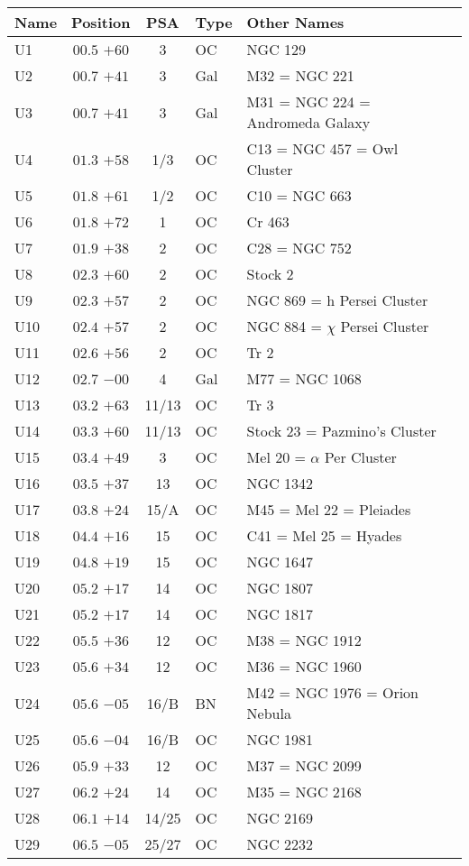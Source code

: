 \begin{table}[p]
\setlength{\tabcolsep}{3pt}
\small
\begin{tabular}{lcclll}
\hline
Name&Position&PSA&Type&Other Names\\
\hline
U1  &$00.5$ $+60$&3&OC &NGC 129\\
U2  &$00.7$ $+41$&3&Gal&M32 = NGC 221\\
U3  &$00.7$ $+41$&3&Gal&M31 = NGC 224 = Andromeda Galaxy\\
U4  &$01.3$ $+58$&1/3&OC &C13 = NGC 457 = Owl Cluster\\
U5  &$01.8$ $+61$&1/2&OC &C10 = NGC 663\\
U6  &$01.8$ $+72$&1&OC &Cr 463\\
U7  &$01.9$ $+38$&2&OC &C28 = NGC 752\\
U8  &$02.3$ $+60$&2&OC &Stock 2\\
U9  &$02.3$ $+57$&2&OC &NGC 869 = h Persei Cluster\\
U10 &$02.4$ $+57$&2&OC &NGC 884 = $\chi$ Persei Cluster\\
U11 &$02.6$ $+56$&2&OC &Tr 2\\
U12 &$02.7$ $-00$&4&Gal&M77 = NGC 1068\\
U13 &$03.2$ $+63$&11/13&OC &Tr 3\\
U14 &$03.3$ $+60$&11/13&OC &Stock 23 = Pazmino's Cluster\\
U15 &$03.4$ $+49$&3&OC &Mel 20 = $\alpha$ Per Cluster\\
U16 &$03.5$ $+37$&13&OC &NGC 1342\\
U17 &$03.8$ $+24$&15/A&OC &M45 = Mel 22 = Pleiades\\
U18 &$04.4$ $+16$&15&OC &C41 = Mel 25 = Hyades\\
U19 &$04.8$ $+19$&15&OC &NGC 1647\\
U20 &$05.2$ $+17$&14&OC &NGC 1807\\
U21 &$05.2$ $+17$&14&OC &NGC 1817\\
U22 &$05.5$ $+36$&12&OC &M38 = NGC 1912\\
U23 &$05.6$ $+34$&12&OC &M36 = NGC 1960\\
U24 &$05.6$ $-05$&16/B&BN &M42 = NGC 1976 = Orion Nebula\\
U25 &$05.6$ $-04$&16/B&OC &NGC 1981\\
U26 &$05.9$ $+33$&12&OC &M37 = NGC 2099\\
U27 &$06.2$ $+24$&14&OC &M35 = NGC 2168\\
U28 &$06.1$ $+14$&14/25&OC &NGC 2169\\
U29 &$06.5$ $-05$&25/27&OC &NGC 2232\\

\end{tabular}
\end{table}
